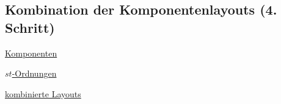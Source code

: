 \subsection{Kombination der Komponentenlayouts (4. Schritt)}
\begin{minipage}{0.2\textwidth}
	\hspace*{1cm}\underline{Komponenten}\\
	
\end{minipage}
\begin{minipage}{0.3\textwidth}
	\centering \underline{$st$-Ordnungen}\\
	
\end{minipage}
\begin{minipage}{0.3\textwidth}
	\centering \underline{kombinierte Layouts}\\
	
\end{minipage}